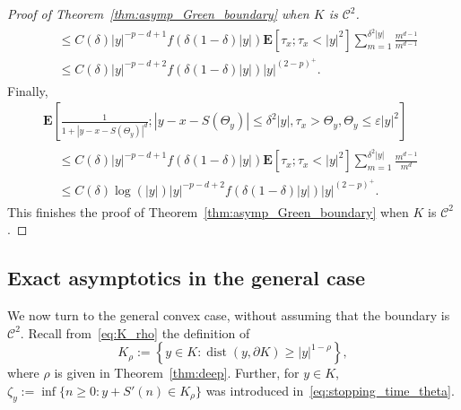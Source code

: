 \documentclass[10pt]{amsart}
\theoremstyle{definition}\newtheorem{defi}[theo]{Definition}\newtheorem{rema}[theo]{Remark}\newtheorem{exam}[theo]{Example}\newtheorem{exem}[theo]{Example}\newtheorem{nota}[theo]{Notation}
\DeclareMathOperator{\dist}{dist}
\newcommand{\clC}{\mathcal{C}}
\newcommand{\e}{\mathbf{E}}
\renewcommand{\le}{\leqslant}
\renewcommand{\geq}{\geqslant}
\begin{document}
\begin{proof}[Proof of Theorem~\ref{thm:asymp_Green_boundary} when $K$ is $\clC^{2}$]
\begin{multline*}
\begin{aligned}
&\le C(\delta)|y|^{-p-d+1}f\left(\delta\left(1-\delta\right)|y|\right)\e\left[\tau_x;\tau_x<|y|^2\right]\sum_{m=1}^{\delta^2|y|}\frac{m^{d-1}}{m^{d-1}}\\
& \le C(\delta)|y|^{-p-d+2}f\left(\delta(1-\delta)|y|\right)|y|^{(2-p)^+}.
\end{aligned}
\end{multline*}
Finally,
\begin{multline*}
\e\left[\frac{1}{1+\left|y-x-S\left(\Theta_y\right)\right|^{d}};\left|y-x-S\left(\Theta_y\right)\right|\le\delta^2|y|,\tau_x>\Theta_y,\Theta_y\le\varepsilon|y|^2\right]\\
\begin{aligned}
&\le C(\delta)|y|^{-p-d+1}f\left(\delta(1-\delta)|y|\right)\e\left[\tau_x;\tau_x<|y|^2\right]\sum_{m=1}^{\delta^2|y|}\frac{m^{d-1}}{m^{d}}\\
& \le C(\delta)\log(|y|)|y|^{-p-d+2}f\left(\delta(1-\delta)|y|\right)|y|^{(2-p)^+}.
\end{aligned}
\end{multline*}
This finishes the proof of Theorem~\ref{thm:asymp_Green_boundary} when $K$ is $\clC^{2}$.
\end{proof}

\subsection*{Exact asymptotics in the general case}

We now turn to the general convex case, without assuming that the boundary is $\clC^2$. Recall from~\eqref{eq:K_rho} the definition of
\[
{K}_{\rho}:=\left\{y\in{K}:\dist(y,\partial {K})\geq | y|^{1-\rho}\right\},
\]
where $\rho$ is given in Theorem~\ref{thm:deep}. Further, for $y\in{K}$, $\zeta_{y}:=\inf\{n\geq 0:y+S'(n)\in{K}_{\rho}\}$ was introduced in~\eqref{eq:stopping_time_theta}.
\end{document}
